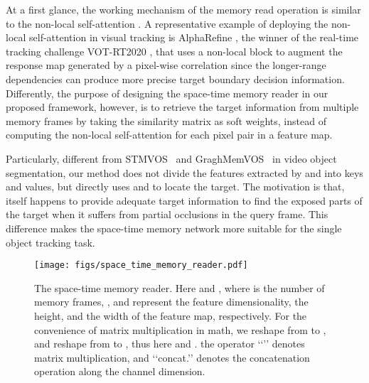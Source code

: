 \documentclass[final]{cvpr}
\begin{document}
At a first glance, the working mechanism of the memory read operation is similar to the non-local self-attention \cite{wang2018non}.
A representative example of deploying the non-local self-attention \cite{wang2018non} in visual tracking is AlphaRefine \cite{yan2020alpha}, the winner of the real-time tracking challenge VOT-RT2020 \cite{Kristan2020a}, that uses a non-local block to augment the response map generated by a pixel-wise correlation since the longer-range dependencies can produce more precise target boundary decision information.
Differently, the purpose of designing the space-time memory reader in our proposed framework, however, is to retrieve the target information from multiple memory frames by taking the similarity matrix as soft weights, instead of computing the non-local self-attention for each pixel pair in a feature map.
\par
Particularly, different from STMVOS~\cite{miller2016key} and GraghMemVOS~\cite{oh2019video} in video object segmentation, our method does not divide the features extracted by  and  into keys and values, but directly uses  and  to locate the target. The motivation is that,  itself happens to provide adequate target information to find the exposed parts of the target when it suffers from partial occlusions in the query frame.
This difference makes the space-time memory network more suitable for the single object tracking task.

\begin{figure}[t]
    \centering
    \texttt{[image: figs/space\_time\_memory\_reader.pdf]}
    \vspace{-1.0em}
    \caption{The space-time memory reader. Here  and , where  is the number of memory frames, ,  and  represent the feature dimensionality, the height, and the width of the feature map, respectively. For the convenience of matrix multiplication in math, we reshape  from  to , and reshape  from  to , thus here  and . the operator \lq\lq{}\rq\rq{} denotes matrix multiplication, and \lq\lq{concat.}\rq\rq{} denotes the concatenation operation along the channel dimension.}
    \label{fig:memory_reader_fig}
 \vspace{-1.0em}
\end{figure}
\end{document}

